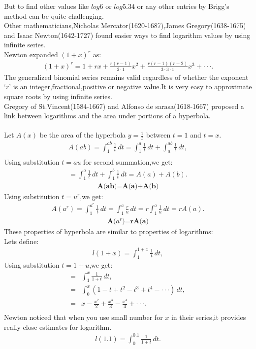 \documentclass[a4paper,reqno,11pt]{book}
\theoremstyle{plain}%
\theoremstyle{definition}
\begin{document}
\noindent But to find other values like $log6$ or $log{5.34}$ or any other entries by Brigg's method can be quite challenging.\\
Other mathematicians,Nicholas Mercator(1620-1687),James Gregory(1638-1675) and Isaac Newton(1642-1727) found easier ways to find logarithm values by using infinite series.\\
Newton expanded $(1+x)^r$ as:
\begin{eqnarray*}
(1+x)^r=1+rx+\frac{r(r-1)}{2\cdot1}x^2+\frac{r(r-1)(r-2)}{3\cdot3\cdot1}x^3+\cdot\cdot\cdot.
\end{eqnarray*}
\noindent The generalized binomial series remains valid regardless of whether the exponent `$r$' is an integer,fractional,positive or negative value.It is very easy to approximate square roots by using infinite series.\\
Gregory of St.Vincent(1584-1667) and Alfonso de sarasa(1618-1667) proposed a link between logarithms and the area under portions of a hyperbola.\\
\\
Let $A(x)$ be the area of the hyperbola $y=\frac{1}{t}$ between $t=1$ and $t=x$.
\begin{eqnarray*}
A(ab)=\int_{1}^{ab}\frac{1}{t}\,dt=\int_{1}^{a}\frac{1}{t}\,dt+\int_{a}^{ab}\frac{1}{t}\,dt,\\
\end{eqnarray*}
\noindent Using substitution $t=au$ for second summation,we get:
\begin{eqnarray*}
=\int_{1}^{a}\frac{1}{t}\,dt+\int_{1}^{b}\frac{1}{t}\,dt
=A(a)+A(b).
\end{eqnarray*}
\begin{eqnarray*}
    \textbf{A(ab)=A(a)+A(b)}
\end{eqnarray*}
\noindent Using substitution $t=u^r$,we get:\\
\begin{eqnarray*}
 A(a^r)=\int_{1}^{a^r}\frac{1}{t}\,dt
=\int_{1}^{a}\frac{r}{u}\,dt
=r\int_{1}^{a}\frac{1}{u}\,dt
=rA(a).
\end{eqnarray*}
\begin{eqnarray*}
    \textbf{A($a^r$)=rA(a)}
\end{eqnarray*}
\noindent These properties of hyperbola are similar to properties of logarithms:\\
Lets define:
\begin{eqnarray*}
    l(1+x)=\int_{1}^{1+x}\frac{1}{t}\,dt,
\end{eqnarray*}
Using substitution $t=1+u$,we get:\\
\begin{align*}
    =&\int_{1}^{x}\frac{1}{1+t}\,dt,\\
    =&\int_{0}^{x}(1-t+t^2-t^3+t^4-\cdot\cdot\cdot)\,dt,\\
    =&x-\frac{x^2}{2}+\frac{x^3}{3}-\frac{x^4}{4}+\cdot\cdot\cdot.\\
\end{align*}
\noindent Newton noticed that when you use small number for $x$ in their series,it provides really close estimates for logarithm.\\
\begin{eqnarray*}
    l(1.1)=\int_{0}^{0.1}\frac{1}{1+t}\,dt.
\end{eqnarray*}
\end{document}
